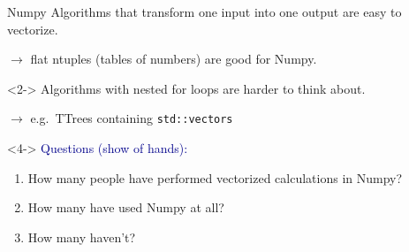 \documentclass[aspectratio=169]{beamer}
\begin{document}
\begin{frame}{Numpy}
\vspace{0.5 cm}
Algorithms that transform one input into one output are easy to vectorize.

\vspace{0.15 cm}
\mbox{\hspace{0.5 cm}}$\longrightarrow$ flat ntuples (tables of numbers) are good for Numpy.

\vspace{0.25 cm}
\begin{uncoverenv}<2->
Algorithms with nested for loops are harder to think about.

\vspace{0.15 cm}
\mbox{\hspace{0.5 cm}}$\longrightarrow$ e.g.\ TTrees containing {\tt\small std::vectors}
\end{uncoverenv}

\vspace{0.25 cm}
\begin{center}
\begin{minipage}{0.85\linewidth}
\end{minipage}
\end{center}

\vspace{0.25 cm}
\begin{uncoverenv}<4->
\small
\textcolor{darkblue}{Questions (show of hands):}
\vspace{-0.2 cm}
\begin{enumerate}\setlength{\itemsep}{-0.1 cm}
\item How many people have performed vectorized calculations in Numpy?
\item How many have used Numpy at all?
\item How many haven't?
\end{enumerate}
\end{uncoverenv}
\end{frame}





\end{document}
